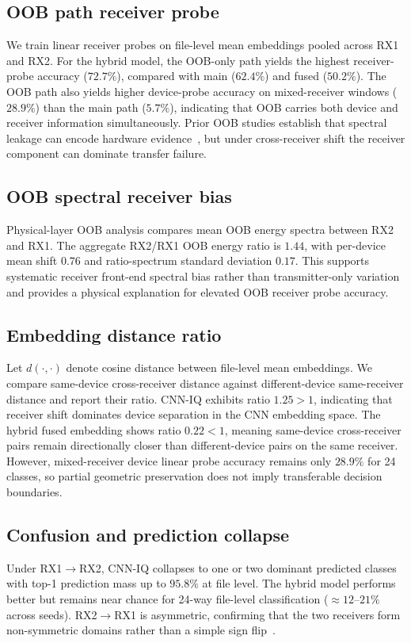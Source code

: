 \subsection{OOB path receiver probe}
We train linear receiver probes on file-level mean embeddings pooled across RX1 and RX2.
For the hybrid model, the OOB-only path yields the highest receiver-probe accuracy ($72.7\%$), compared with main ($62.4\%$) and fused ($50.2\%$).
The OOB path also yields higher device-probe accuracy on mixed-receiver windows ($28.9\%$) than the main path ($5.7\%$), indicating that OOB carries both device and receiver information simultaneously.
Prior OOB studies establish that spectral leakage can encode hardware evidence~\cite{elmaghbub2020widescan,hamdaoui2022deeplearning}, but under cross-receiver shift the receiver component can dominate transfer failure.

\subsection{OOB spectral receiver bias}
Physical-layer OOB analysis compares mean OOB energy spectra between RX2 and RX1.
The aggregate RX2/RX1 OOB energy ratio is $1.44$, with per-device mean shift $0.76$ and ratio-spectrum standard deviation $0.17$.
This supports systematic receiver front-end spectral bias rather than transmitter-only variation and provides a physical explanation for elevated OOB receiver probe accuracy.

\subsection{Embedding distance ratio}
Let $d(\cdot,\cdot)$ denote cosine distance between file-level mean embeddings.
We compare same-device cross-receiver distance against different-device same-receiver distance and report their ratio.
CNN-IQ exhibits ratio $1.25>1$, indicating that receiver shift dominates device separation in the CNN embedding space.
The hybrid fused embedding shows ratio $0.22<1$, meaning same-device cross-receiver pairs remain directionally closer than different-device pairs on the same receiver.
However, mixed-receiver device linear probe accuracy remains only $28.9\%$ for 24 classes, so partial geometric preservation does not imply transferable decision boundaries.

\subsection{Confusion and prediction collapse}
Under RX1$\rightarrow$RX2, CNN-IQ collapses to one or two dominant predicted classes with top-1 prediction mass up to $95.8\%$ at file level.
The hybrid model performs better but remains near chance for 24-way file-level classification ($\approx 12$--$21\%$ across seeds).
RX2$\rightarrow$RX1 is asymmetric, confirming that the two receivers form non-symmetric domains rather than a simple sign flip~\cite{yang2024cross_receiver_da}.


